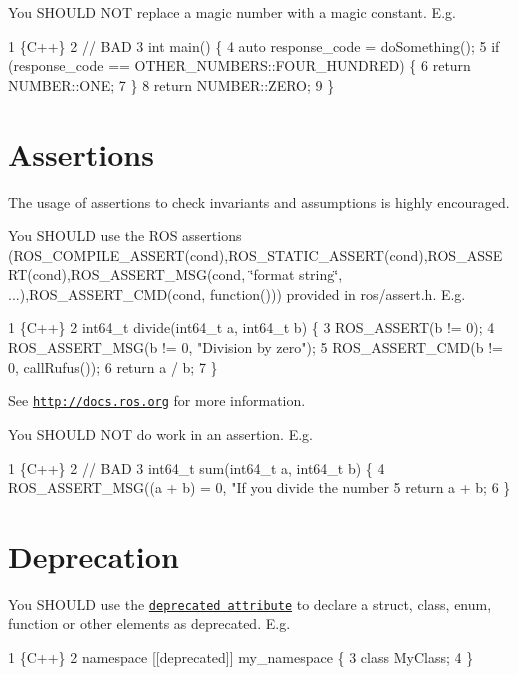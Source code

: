 You S\+H\+O\+U\+LD N\+OT replace a magic number with a magic constant. E.\+g. 
\begin{DoxyCode}
1 \{C++\}
2 // BAD
3 int main() \{
4     auto response\_code = doSomething();
5     if (response\_code == OTHER\_NUMBERS::FOUR\_HUNDRED) \{
6         return NUMBER::ONE;
7     \}
8     return NUMBER::ZERO;
9 \}
\end{DoxyCode}
  \section*{Assertions}

The usage of assertions to check invariants and assumptions is highly encouraged.

You S\+H\+O\+U\+LD use the R\+OS assertions ({\ttfamily R\+O\+S\+\_\+\+C\+O\+M\+P\+I\+L\+E\+\_\+\+A\+S\+S\+E\+R\+T(cond)},{\ttfamily R\+O\+S\+\_\+\+S\+T\+A\+T\+I\+C\+\_\+\+A\+S\+S\+E\+R\+T(cond)},{\ttfamily R\+O\+S\+\_\+\+A\+S\+S\+E\+R\+T(cond)},{\ttfamily R\+O\+S\+\_\+\+A\+S\+S\+E\+R\+T\+\_\+\+M\+SG(cond, \char`\"{}format string\char`\"{}, ...)},{\ttfamily R\+O\+S\+\_\+\+A\+S\+S\+E\+R\+T\+\_\+\+C\+M\+D(cond, function())}) provided in {\ttfamily ros/assert.\+h}. E.\+g. 
\begin{DoxyCode}
1 \{C++\}
2 int64\_t divide(int64\_t a, int64\_t b) \{    
3     ROS\_ASSERT(b != 0);
4     ROS\_ASSERT\_MSG(b != 0, "Division by zero");
5     ROS\_ASSERT\_CMD(b != 0, callRufus());
6     return a / b;
7 \}
\end{DoxyCode}
 See \href{http://docs.ros.org/electric/api/rosconsole/html/assert_8h.html}{\tt http\+://docs.\+ros.\+org} for more information.

You S\+H\+O\+U\+LD N\+OT do work in an assertion. E.\+g. 
\begin{DoxyCode}
1 \{C++\}
2 // BAD
3 int64\_t sum(int64\_t a, int64\_t b) \{
4     ROS\_ASSERT\_MSG((a + b) = 0, "If you divide the number %
5     return a + b;
6 \}
\end{DoxyCode}
  \section*{Deprecation}

You S\+H\+O\+U\+LD use the \href{https://en.cppreference.com/w/cpp/language/attributes/deprecated}{\tt deprecated attribute} to declare a {\ttfamily struct}, {\ttfamily class}, {\ttfamily enum}, {\ttfamily function} or other elements as deprecated. E.\+g. 
\begin{DoxyCode}
1 \{C++\}
2 namespace [[deprecated]] my\_namespace \{
3     class MyClass;
4 \}
\end{DoxyCode}


